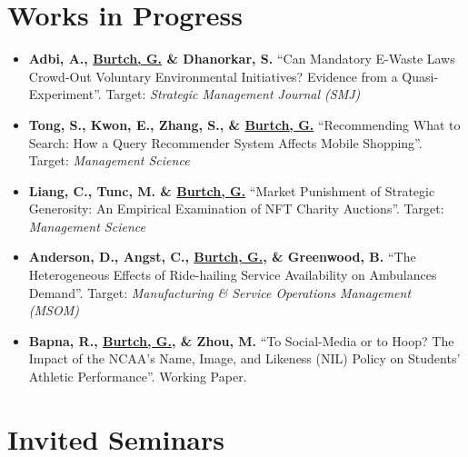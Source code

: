 \documentclass[10.5pt,letterpaper,sans]{moderncv}        %
\begin{document}
\section{Works in Progress}

\begin{itemize}[leftmargin=!,labelindent=5pt,itemindent=-15pt]

\item \textbf{Adbi, A., \underline{Burtch, G.} \& Dhanorkar, S.} ``Can Mandatory E-Waste Laws Crowd-Out Voluntary Environmental Initiatives? Evidence from a Quasi-Experiment''. Target: \textit{Strategic Management Journal (SMJ)}

\item \textbf{Tong, S., Kwon, E., Zhang, S., \& \underline{Burtch, G.}} ``Recommending What to Search: How a Query Recommender System Affects Mobile Shopping''. Target: \textit{Management Science} 



\item \textbf{Liang, C., Tunc, M. \& \underline{Burtch, G.}} ``Market Punishment of Strategic Generosity: An Empirical Examination of NFT Charity Auctions''. Target: \textit{Management Science}

\item \textbf{Anderson, D., Angst, C., \underline{Burtch, G.}, \& Greenwood, B.} ``The Heterogeneous Effects of Ride-hailing Service Availability on Ambulances Demand''. Target: \textit{Manufacturing \& Service Operations Management (MSOM)}

\item \textbf{Bapna, R., \underline{Burtch, G.}, \& Zhou, M.} ``To Social-Media or to Hoop? The Impact of the NCAA's Name, Image, and Likeness (NIL) Policy on Students' Athletic Performance''. Working Paper.

\end{itemize}

\section{Invited Seminars}
\end{document}
